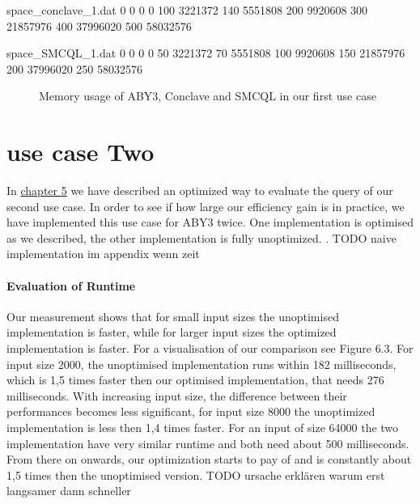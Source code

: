\begin{filecontents}{space_conclave_1.dat}
	0 0
	0 0
	100 3221372
	140 5551808
	200 9920608
	300 21857976
	400 37996020
	500 58032576
\end{filecontents}
\begin{filecontents}{space_SMCQL_1.dat}
	0 0
	0 0
	50 3221372
	70 5551808
	100 9920608
	150 21857976
	200 37996020
	250 58032576
\end{filecontents}
\begin{figure}
	\caption{Memory usage of ABY3, Conclave and SMCQL in our first use case}
\end{figure}
\section{use case Two} 
In \hyperref[Use Case two]{chapter 5} we have described an optimized way to evaluate the query of our second use case. In order to see if how large our efficiency gain is in practice, we have implemented this use case for ABY3 twice. One implementation is optimised as we described, the other implementation is fully unoptimized. . TODO naive implementation im appendix wenn zeit
\paragraph{Evaluation of Runtime}
Our measurement shows that for small input sizes the unoptimised implementation is faster, while for larger input sizes the optimized implementation is faster. For a visualisation of our comparison see Figure 6.3. For input size 2000, the unoptimised implementation runs within 182 milliseconds, which is 1,5 times faster then our optimised implementation, that needs 276 milliseconds. With increasing input size, the difference between their performances becomes less significant, for input size 8000 the unoptimized implementation is less then 1,4 times faster. For an input of size 64000 the two implementation have very similar runtime and both need about 500 milliseconds. From there on onwards, our optimization starts to pay of and is constantly about 1,5 times then the unoptimised version. 
TODO ursache erklären warum erst langsamer dann schneller

